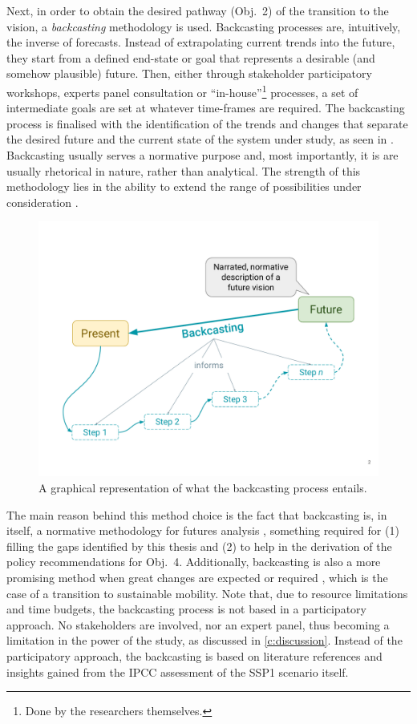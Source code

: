 Next, in order to obtain the desired pathway (Obj.~2) of the transition to the vision, a \emph{backcasting} methodology is used. Backcasting processes are, intuitively, the inverse of forecasts. Instead of extrapolating current trends into the future, they start from a defined end-state or goal that represents a desirable (and somehow plausible) future. Then, either through stakeholder participatory workshops, experts panel consultation or ``in-house''\footnote{Done by the researchers themselves.} processes, a set of intermediate goals are set at whatever time-frames are required. The backcasting process is finalised with the identification of the trends and changes that separate the desired future and the current state of the system under study, as seen in  \parencite{dreborg1996_Essencebackcasting}. Backcasting usually serves a normative purpose and, most importantly, it is are usually rhetorical in nature, rather than analytical. The strength of this methodology lies in the ability to extend the range of possibilities under consideration \parencite{mcdowall2006_Forecastsscenariosvisions}.

\begin{figure}
\centering
\includegraphics[width=0.7\linewidth,trim=0 2cm 0 2cm,clip]{figures/backcasting.pdf}
\caption[Backcasting framework]{A graphical representation of what the backcasting process entails.}
\label{f:backcasting-methods}
\end{figure}

The main reason behind this method choice is the fact that backcasting is, in itself, a normative methodology for futures analysis \parencite{boerjeson2006_Scenariotypestechniques,mcdowall2006_Forecastsscenariosvisions}, something required for (1) filling the gaps identified by this thesis and (2) to help in the derivation of the policy recommendations for Obj.~4. Additionally, backcasting is also a more promising method when great changes are expected or required \parencite{hoejer2000_Determinismbackcastingfuture}, which is the case of a transition to sustainable mobility. Note that, due to resource limitations and time budgets, the backcasting process is not based in a participatory approach. No stakeholders are involved, nor an expert panel, thus becoming a limitation in the power of the study, as discussed in \cref{c:discussion}. Instead of the participatory approach, the backcasting is based on literature references and insights gained from the IPCC assessment of the SSP1 scenario itself.